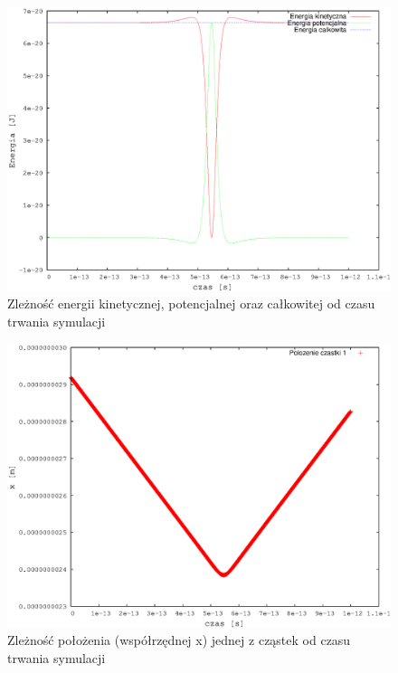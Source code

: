 \documentclass[a4paper,10pt]{article}
\begin{document}
\begin{figure}[h]
\begin{center}
\includegraphics[scale=0.6]{wyniki/2particles-collision.eps}
\caption{Zleżność energii kinetycznej, potencjalnej oraz całkowitej od czasu trwania symulacji}
\label{pic:collision}
\end{center}
\end{figure}
\FloatBarrier

\begin{figure}[h]
\begin{center}
\includegraphics[scale=0.6]{wyniki/pos-particles-collision.eps}
\caption{Zleżność położenia (współrzędnej x) jednej z cząstek od czasu trwania symulacji}
\label{pic:collision-pos}
\end{center}
\end{figure}
\FloatBarrier
\end{document}
